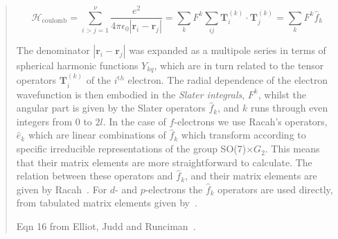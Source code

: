 \begin{quotation}
\item[\bf Coulomb electron electron interaction operator:]
\[ \mathcal{H}_{\mathrm{coulomb}} = \sum_{i>j=1}^\nu \frac{e^2}{4\pi\epsilon_0|\mathbf{r}_i-\mathbf{r}_j|} = 
    \sum_{k} F^k \sum_{ij} {\mathbf T}_i^{(k)} \cdot {\mathbf T}_j^{(k)} = \sum_k F^k \hat f_k \]

\noindent The denominator $|\mathbf{r}_i-\mathbf{r}_j|$ was expanded as a multipole series in terms 
of spherical harmonic functions $Y_{kq}$, which are in turn related to the tensor operators ${\mathbf
T}_i^{(k)}$ of the $i^{\mathrm th}$ electron. The radial dependence of the electron wavefunction is
then embodied in the \emph{Slater integrals}, $F^k$, whilst the angular part is given by the Slater
operators $\hat f_k$, and $k$ runs through even integers from 0 to $2l$. In the case of $f$-electrons 
we use Racah's operators, $\hat e_k$ which are linear combinations of $\hat f_k$ which transform according to
specific irreducible representations of the group SO(7)$\times G_2$. This means that their matrix
elements are more straightforward to calculate. The relation between these operators and $\hat f_k$, and
their matrix elements are given by Racah~\cite{racah49-1352}. For $d$- and $p$-electrons the $\hat f_k$
operators are used directly, from tabulated matrix elements given by~\cite{nielson63-1}. 
%
%
%
\\
\item[\bf Spin-orbit interaction operator $\mathcal H_{\mathrm {spinorbit}}=\zeta \sum_i ({\mbf s}_i . {\mbf l}_i)$:]
Eqn 16 from Elliot, Judd and Runciman~\cite{elliot57-509}.
\\



\end{quotation}
